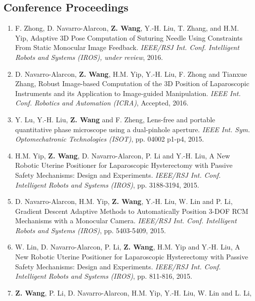 \documentclass[10pt,letterpaper]{article}
\begin{document}
\subsection*{Conference Proceedings}
\begin{enumerate}
\item F. Zhong, D. Navarro-Alarcon, \textbf{Z. Wang}, Y.-H. Liu, T. Zhang, and H.M. Yip,
  Adaptive 3D Pose Computation of Suturing Needle Using Constraints From Static Monocular Image Feedback.
  \textit{{IEEE/RSJ} Int. Conf. Intelligent Robots and Systems (IROS), under review}, 2016.  
\item D. Navarro-Alarcon, \textbf{Z. Wang}, H.M. Yip, Y.-H. Liu, F. Zhong and Tianxue Zhang,
  Robust Image-based Computation of the 3D Position of Laparoscopic Instruments and its Application to Image-guided Manipulation.
  \textit{{IEEE} Int. Conf. Robotics and Automation (ICRA)}, Accepted, 2016.
\item Y. Lu, Y.-H. Liu, \textbf{Z. Wang} and F. Zheng,
  Lens-free and portable quantitative phase microscope using a dual-pinhole aperture.
  \textit{{IEEE} Int. Sym. Optomechatronic Technologies (ISOT)}, pp. 04002 p1-p4, 2015.
\item H.M. Yip, \textbf{Z. Wang}, D. Navarro-Alarcon, P. Li and Y.-H. Liu,
  A New Robotic Uterine Positioner for Laparoscopic Hysterectomy with Passive Safety Mechanisms: Design and Experiments.
  \textit{{IEEE/RSJ} Int. Conf. Intelligent Robots and Systems (IROS)}, pp. 3188-3194, 2015.
\item D. Navarro-Alarcon, H.M. Yip, \textbf{Z. Wang}, Y.-H. Liu, W. Lin and P. Li,
  Gradient Descent Adaptive Methods to Automatically Position 3-DOF RCM Mechanisms with a Monocular Camera.
  \textit{{IEEE/RSJ} Int. Conf. Intelligent Robots and Systems (IROS)}, pp. 5403-5409, 2015.
\item W. Lin, D. Navarro-Alarcon, P. Li, \textbf{Z. Wang}, H.M. Yip and Y.-H. Liu,
  A New Robotic Uterine Positioner for Laparoscopic Hysterectomy with Passive Safety Mechanisms: Design and Experiments.
  \textit{{IEEE/RSJ} Int. Conf. Intelligent Robots and Systems (IROS)}, pp. 811-816, 2015.
\item \textbf{Z. Wang}, P. Li, D. Navarro-Alarcon, H.M. Yip, Y.-H. Liu, W. Lin and L. Li,

\end{enumerate}
\end{document}
